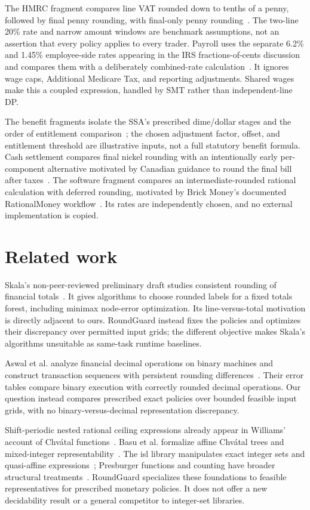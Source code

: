 \documentclass[11pt]{article}
\begin{document}
The HMRC fragment compares line VAT rounded down to tenths of a penny, followed by final penny rounding, with final-only penny rounding~\citep{hmrc_vat}. The two-line 20\% rate and narrow amount windows are benchmark assumptions, not an assertion that every policy applies to every trader. Payroll uses the separate 6.2\% and 1.45\% employee-side rates appearing in the IRS fractions-of-cents discussion and compares them with a deliberately combined-rate calculation~\citep{irs_p15}. It ignores wage caps, Additional Medicare Tax, and reporting adjustments. Shared wages make this a coupled expression, handled by SMT rather than independent-line DP.

The benefit fragments isolate the SSA's prescribed dime/dollar stages and the order of entitlement comparison~\citep{ssa_rounding}; the chosen adjustment factor, offset, and entitlement threshold are illustrative inputs, not a full statutory benefit formula. Cash settlement compares final nickel rounding with an intentionally early per-component alternative motivated by Canadian guidance to round the final bill after taxes~\citep{cra_cash}. The software fragment compares an intermediate-rounded rational calculation with deferred rounding, motivated by Brick Money's documented RationalMoney workflow~\citep{brick_money}. Its rates are independently chosen, and no external implementation is copied.

\section{Related work}
Skala's non-peer-reviewed preliminary draft studies consistent rounding of financial totals~\citep{skala2017}. It gives algorithms to choose rounded labels for a fixed totals forest, including minimax node-error optimization. Its line-versus-total motivation is directly adjacent to ours. RoundGuard instead fixes the policies and optimizes their discrepancy over permitted input grids; the different objective makes Skala's algorithms unsuitable as same-task runtime baselines.

Aswal et al. analyze financial decimal operations on binary machines and construct transaction sequences with persistent rounding differences~\citep{aswal2012}. Their error tables compare binary execution with correctly rounded decimal operations. Our question instead compares prescribed exact policies over bounded feasible input grids, with no binary-versus-decimal representation discrepancy.

Shift-periodic nested rational ceiling expressions already appear in Williams' account of Chv\'atal functions~\citep{williams2011}. Basu et al. formalize affine Chv\'atal trees and mixed-integer representability~\citep{basu_et_al2019}. The isl library manipulates exact integer sets and quasi-affine expressions~\citep{verdoolaege2010}; Presburger functions and counting have broader structural treatments~\citep{woods2015}. RoundGuard specializes these foundations to feasible representatives for prescribed monetary policies. It does not offer a new decidability result or a general competitor to integer-set libraries.
\end{document}
